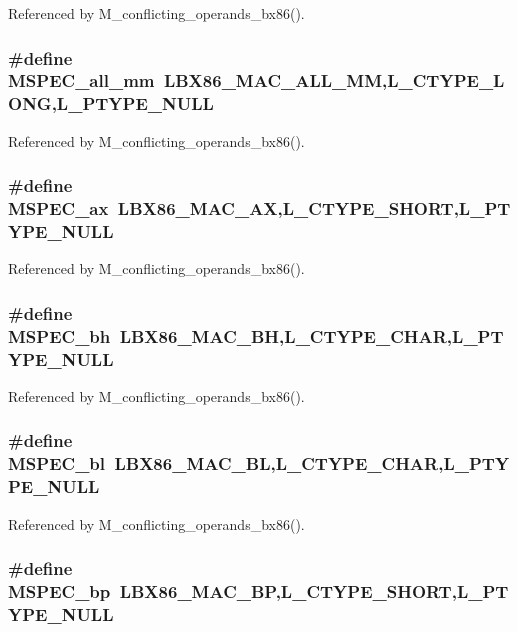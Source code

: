 Referenced by M\_\-conflicting\_\-operands\_\-bx86().
\subsubsection{\setlength{\rightskip}{0pt plus 5cm}\#define MSPEC\_\-all\_\-mm~LBX86\_\-MAC\_\-ALL\_\-MM,L\_\-CTYPE\_\-LONG,L\_\-PTYPE\_\-NULL}\label{ml__bx86_8c_7443dcaa44f2bb3edec6ae7a7fda2897}




Referenced by M\_\-conflicting\_\-operands\_\-bx86().
\subsubsection{\setlength{\rightskip}{0pt plus 5cm}\#define MSPEC\_\-ax~LBX86\_\-MAC\_\-AX,L\_\-CTYPE\_\-SHORT,L\_\-PTYPE\_\-NULL}\label{ml__bx86_8c_7f95175376765db7e12bcbaf1d26c11a}




Referenced by M\_\-conflicting\_\-operands\_\-bx86().
\subsubsection{\setlength{\rightskip}{0pt plus 5cm}\#define MSPEC\_\-bh~LBX86\_\-MAC\_\-BH,L\_\-CTYPE\_\-CHAR,L\_\-PTYPE\_\-NULL}\label{ml__bx86_8c_e49d53a69b9b262548676c3ed29abd2e}




Referenced by M\_\-conflicting\_\-operands\_\-bx86().
\subsubsection{\setlength{\rightskip}{0pt plus 5cm}\#define MSPEC\_\-bl~LBX86\_\-MAC\_\-BL,L\_\-CTYPE\_\-CHAR,L\_\-PTYPE\_\-NULL}\label{ml__bx86_8c_0e238ea99b2b6c61fbc20968e5ba3d2d}




Referenced by M\_\-conflicting\_\-operands\_\-bx86().
\subsubsection{\setlength{\rightskip}{0pt plus 5cm}\#define MSPEC\_\-bp~LBX86\_\-MAC\_\-BP,L\_\-CTYPE\_\-SHORT,L\_\-PTYPE\_\-NULL}\label{ml__bx86_8c_0e951a6e0eaf9fa1e87d36c576270e4a}




